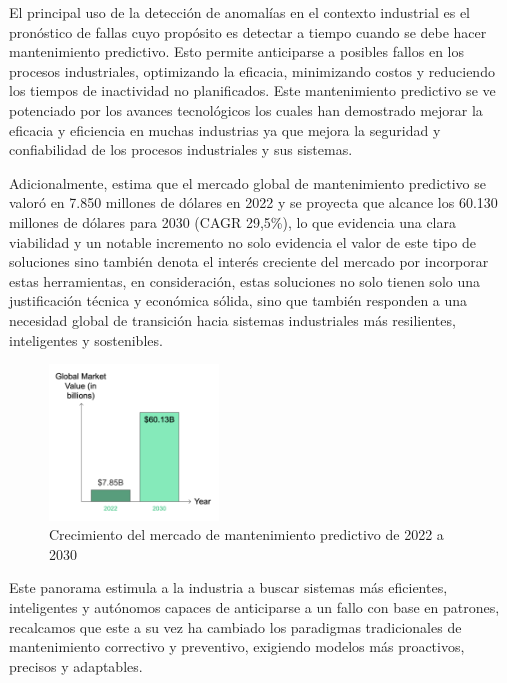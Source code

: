 \documentclass[11pt,a4paper,spanish]{book}
\numberwithin{equation}{chapter}
\numberwithin{figure}{chapter}
\begin{document}
El principal uso de la detección de anomalías en el contexto industrial es el pronóstico 
de fallas cuyo propósito es detectar a tiempo cuando se debe hacer mantenimiento 
predictivo. Esto permite anticiparse a posibles fallos en los procesos industriales, 
optimizando la eficacia, minimizando costos y reduciendo los tiempos de inactividad no 
planificados. Este mantenimiento predictivo se ve potenciado por los avances tecnológicos 
los cuales han demostrado mejorar la eficacia y eficiencia en muchas industrias ya que 
mejora la seguridad y confiabilidad de los procesos industriales y sus sistemas.


Adicionalmente, \cite{worktrek2023predictive} estima que el mercado global de 
mantenimiento predictivo se valoró en 7.850 millones de dólares en 2022 y se proyecta 
que alcance los 60.130 millones de dólares para 2030 (CAGR 29,5\%), lo que evidencia 
una clara viabilidad y un notable incremento no solo evidencia el valor de este tipo de 
soluciones sino también denota el interés creciente del mercado por incorporar estas 
herramientas, en consideración, estas soluciones no solo tienen solo una  justificación 
técnica y económica sólida, sino que también responden a una necesidad global de 
transición hacia sistemas industriales más resilientes, inteligentes y sostenibles.


\begin{figure}[h]
    \centering
    \includegraphics[width=0.4\textwidth]{media/worktrek.png}
    \caption{Crecimiento del mercado de mantenimiento predictivo de 2022 a 2030  \protect\cite{worktrek2023predictive}}
    \label{fig:figWorkTrek}
\end{figure}


Este panorama estimula a la industria a buscar sistemas más eficientes, inteligentes y 
autónomos capaces de anticiparse a un fallo con base en patrones, recalcamos que este a 
su vez ha cambiado los paradigmas tradicionales de mantenimiento correctivo y preventivo,
exigiendo modelos más proactivos, precisos y adaptables.
\end{document}
